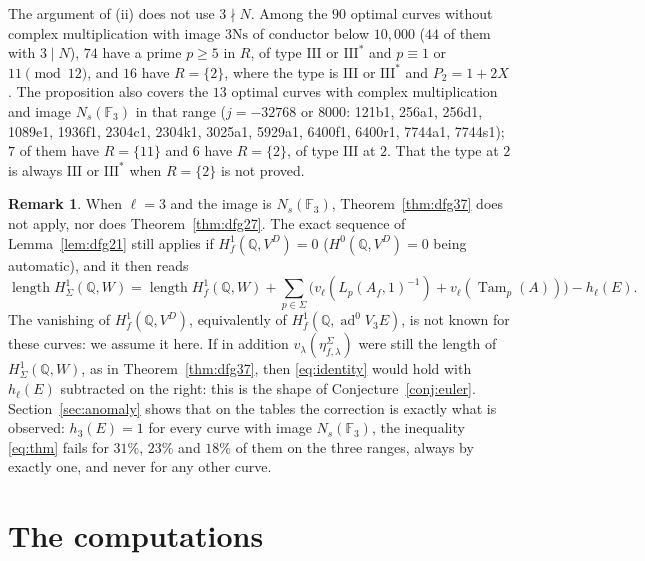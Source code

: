 \documentclass[11pt]{amsart}
\theoremstyle{definition}
\newtheorem{remark}[theorem]{Remark}
\newcommand{\Q}{\mathbb{Q}}
\newcommand{\F}{\mathbb{F}}
\newcommand{\ad}{\operatorname{ad}^0}
\newcommand{\Tam}{\operatorname{Tam}}
\newcommand{\len}{\operatorname{length}}
\newcommand{\Ns}{3\mathrm{Ns}}
\begin{document}
The argument of (ii) does not use $3\nmid N$. Among the $90$ optimal curves without complex multiplication with image $\Ns$ of conductor below $10{,}000$ ($44$ of them with $3\mid N$), $74$ have a prime $p\ge5$ in $R$, of type $\mathrm{III}$ or $\mathrm{III}^*$ and $p\equiv1$ or $11\pmod{12}$, and $16$ have $R=\{2\}$, where the type is $\mathrm{III}$ or $\mathrm{III}^*$ and $P_2=1+2X$. The proposition also covers the $13$ optimal curves with complex multiplication and image $N_s(\F_3)$ in that range ($j=-32768$ or $8000$: 121b1, 256a1, 256d1, 1089e1, 1936f1, 2304c1, 2304k1, 3025a1, 5929a1, 6400f1, 6400r1, 7744a1, 7744s1); $7$ of them have $R=\{11\}$ and $6$ have $R=\{2\}$, of type $\mathrm{III}$ at $2$. That the type at $2$ is always $\mathrm{III}$ or $\mathrm{III}^*$ when $R=\{2\}$ is not proved.

\begin{remark}\label{rem:ns}
When $\ell=3$ and the image is $N_s(\F_3)$, Theorem~\ref{thm:dfg37} does not apply, nor does Theorem~\ref{thm:dfg27}. The exact sequence of Lemma~\ref{lem:dfg21} still applies if $H^1_f(\Q,V^D)=0$ ($H^0(\Q,V^D)=0$ being automatic), and it then reads
\[
\len H^1_\Sigma(\Q,W)=\len H^1_f(\Q,W)+\sum_{p\in\Sigma}\bigl(v_\ell(L_p(A_f,1)^{-1})+v_\ell(\Tam_p(A))\bigr)-h_\ell(E).
\]
The vanishing of $H^1_f(\Q,V^D)$, equivalently of $H^1_f(\Q,\ad V_3E)$, is not known for these curves: we assume it here. If in addition $v_\lambda(\eta^\Sigma_{f,\lambda})$ were still the length of $H^1_\Sigma(\Q,W)$, as in Theorem~\ref{thm:dfg37}, then \eqref{eq:identity} would hold with $h_\ell(E)$ subtracted on the right: this is the shape of Conjecture~\ref{conj:euler}. Section~\ref{sec:anomaly} shows that on the tables the correction is exactly what is observed: $h_3(E)=1$ for every curve with image $N_s(\F_3)$, the inequality \eqref{eq:thm} fails for $31\%$, $23\%$ and $18\%$ of them on the three ranges, always by exactly one, and never for any other curve.
\end{remark}

\section{The computations}\label{sec:data}
\end{document}
